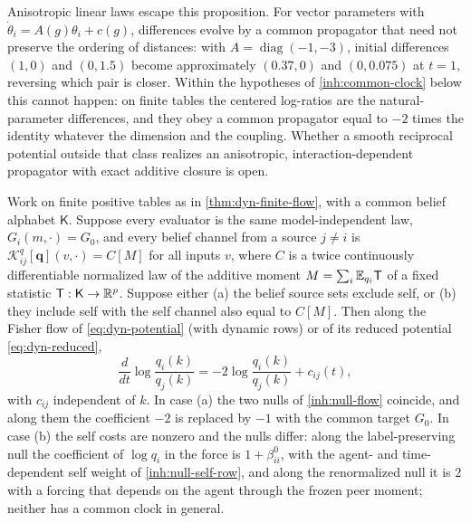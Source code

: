 Anisotropic linear laws escape this proposition. For vector parameters with
$\dot\theta_i=A(g)\theta_i+c(g)$, differences evolve by a common propagator
that need not preserve the ordering of distances: with
$A=\operatorname{diag}(-1,-3)$, initial differences $(1,0)$ and $(0,1.5)$
become approximately $(0.37,0)$ and $(0,0.075)$ at $t=1$, reversing which
pair is closer. Within the hypotheses of \cref{inh:common-clock} below this
cannot happen: on finite tables the centered log-ratios are the
natural-parameter differences, and they obey a common propagator equal to
$-2$ times the identity whatever the dimension and the coupling. Whether a
smooth reciprocal potential outside that class realizes an anisotropic,
interaction-dependent propagator with exact additive closure is open.

Work on finite positive tables as in \cref{thm:dyn-finite-flow}, with a
common belief alphabet $\mathsf K$. Suppose every evaluator is the same
model-independent law, $G_i(m,\cdot)=G_0$, and every belief channel from a
source $j\neq i$ is $\mathcal K^q_{ij}[\mathbf q](v,\cdot)=C[M]$ for all
inputs $v$, where $C$ is a twice continuously differentiable normalized law
of the additive moment $M=\sum_i\mathbb E_{q_i}\mathsf T$ of a fixed statistic
$\mathsf T:\mathsf K\to\mathbb R^p$. Suppose either (a) the belief source sets
exclude self, or (b) they include self with the self channel also equal to
$C[M]$. Then along the Fisher flow of \cref{eq:dyn-potential} (with dynamic
rows) or of its reduced potential \cref{eq:dyn-reduced},
\begin{equation}
 \frac{d}{dt}\log\frac{q_i(k)}{q_j(k)}
 =-2\log\frac{q_i(k)}{q_j(k)}+c_{ij}(t),
 \label{inh:common-clock-identity}
\end{equation}
with $c_{ij}$ independent of $k$. In case (a) the two nulls of
\cref{inh:null-flow} coincide, and along them the coefficient $-2$ is
replaced by $-1$ with the common target $G_0$. In case (b) the self costs
are nonzero and the nulls differ: along the label-preserving null the
coefficient of $\log q_i$ in the force is $1+\beta^0_{ii}$, with the agent-
and time-dependent self weight of \cref{inh:null-self-row}, and along the
renormalized null it is $2$ with a forcing that depends on the agent through
the frozen peer moment; neither has a common clock in general.
